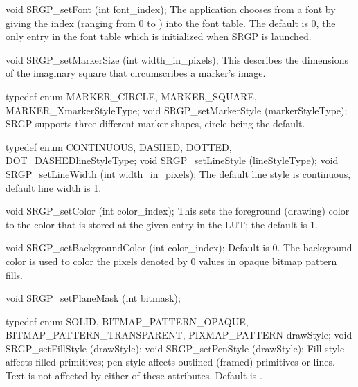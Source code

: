 \nextsynopsis
void SRGP_setFont (int font_index);
\endsynopsis
The application chooses from a font by giving the index (ranging from 0 to
) into the font table.  The default is 0, the only entry
in the font table which is initialized when SRGP is launched.

\nextsynopsis
void SRGP_setMarkerSize (int width_in_pixels);
\endsynopsis
This describes the dimensions of the imaginary square that circumscribes a
marker's image.

\nextsynopsis
typedef enum \lb{}MARKER_CIRCLE, MARKER_SQUARE, MARKER_X\rb markerStyleType;
void SRGP_setMarkerStyle (markerStyleType);
\endsynopsis
SRGP supports three different marker shapes, circle being the default.

\nextsynopsis
typedef enum \lb{}CONTINUOUS, DASHED, DOTTED, DOT_DASHED\rb lineStyleType;
void SRGP_setLineStyle (lineStyleType);
void SRGP_setLineWidth (int width_in_pixels);
\endsynopsis
The default line style is continuous, default line width is 1.

\nextsynopsis
void SRGP_setColor (int color_index);
\endsynopsis
This sets the foreground (drawing) color to the color that is stored at the
given entry in the LUT; the default is 1.

\nextsynopsis
void SRGP_setBackgroundColor (int color_index);
\endsynopsis
Default is 0.  The background color is used to color the pixels denoted by 0
values in opaque bitmap pattern fills.

\nextsynopsis
void SRGP_setPlaneMask (int bitmask);
\endsynopsis
{}
\MACNOHAVE

\nextsynopsis
typedef enum \lb{}
  SOLID, BITMAP_PATTERN_OPAQUE, BITMAP_PATTERN_TRANSPARENT, PIXMAP_PATTERN\rb
    drawStyle;
void SRGP_setFillStyle (drawStyle);
void SRGP_setPenStyle (drawStyle);
\endsynopsis
Fill style affects filled primitives; pen style affects outlined (framed)
primitives or lines.   Text is not affected by either of these attributes.
Default is .



